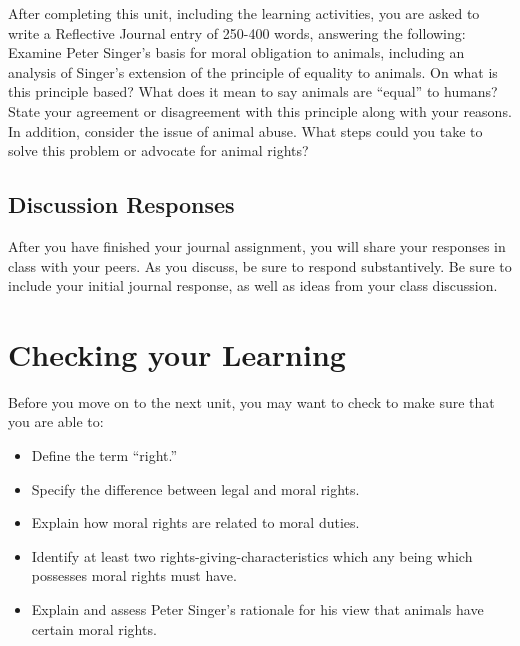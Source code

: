 \documentclass[
]{book}
\providecommand{\tightlist}{%
  \setlength{\itemsep}{0pt}\setlength{\parskip}{0pt}}
\begin{document}
\begin{assessment}
After completing this unit, including the learning activities, you are asked to
write a Reflective Journal entry of 250-400 words, answering the following:
Examine Peter Singer's basis for moral obligation to animals, including an analysis of Singer's extension of the principle of equality to animals. On what is this principle based? What does it mean to say animals are ``equal'' to humans?~ State your agreement or disagreement with this principle along with your reasons.
In addition, consider the issue of animal abuse. What steps could you take to solve this problem or advocate for animal rights?

\hypertarget{discussion-responses-2}{%
\subsection*{Discussion Responses}\label{discussion-responses-2}}

After you have finished your journal assignment, you will share your responses in class with your peers. As you discuss, be sure to respond substantively. Be sure to include your initial journal response, as well as ideas from your class discussion.
\end{assessment}

\hypertarget{checking-your-learning-6}{%
\section*{Checking your Learning}\label{checking-your-learning-6}}

\begin{progress}
Before you move on to the next unit, you may want to check to make sure that you are able to:

\begin{itemize}
\tightlist
\item
  Define the term ``right.''\\
\item
  Specify the difference between legal and moral rights.\\
\item
  Explain how moral rights are related to moral duties.\\
\item
  Identify at least two rights-giving-characteristics which any being which possesses moral rights must have.\\
\item
  Explain and assess Peter Singer's rationale for his view that animals have certain moral rights.
\end{itemize}
\end{progress}
\end{document}
